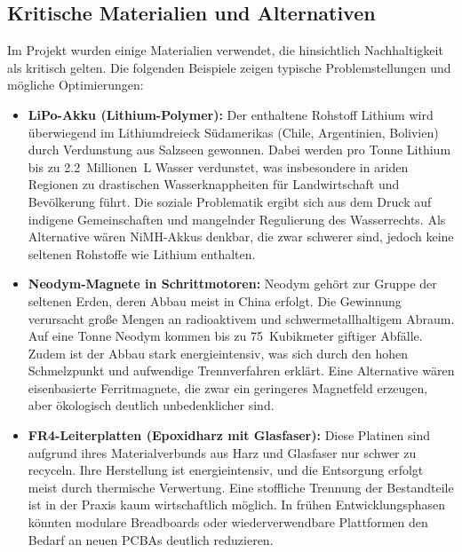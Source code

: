 \documentclass[main.tex]{subfiles} %
\begin{document}

\subsection{Kritische Materialien und Alternativen}

Im Projekt wurden einige Materialien verwendet, die hinsichtlich Nachhaltigkeit 
als kritisch gelten. Die folgenden Beispiele zeigen typische Problemstellungen 
und mögliche Optimierungen:

\begin{itemize}
    \item \textbf{LiPo-Akku (Lithium-Polymer):} 
    Der enthaltene Rohstoff Lithium wird überwiegend im Lithiumdreieck Südamerikas 
    (Chile, Argentinien, Bolivien) durch Verdunstung aus Salzseen gewonnen. Dabei 
    werden pro Tonne Lithium bis zu \SI{2.2}{Millionen\liter} Wasser verdunstet, 
    was insbesondere in ariden Regionen zu drastischen Wasserknappheiten für 
    Landwirtschaft und Bevölkerung führt. Die soziale Problematik ergibt sich aus 
    dem Druck auf indigene Gemeinschaften und mangelnder Regulierung des Wasserrechts. 
    Als Alternative wären NiMH-Akkus denkbar, die zwar schwerer sind, jedoch keine 
    seltenen Rohstoffe wie Lithium enthalten.
    
    \item \textbf{Neodym-Magnete in Schrittmotoren:} 
    Neodym gehört zur Gruppe der seltenen Erden, deren Abbau meist in China erfolgt. 
    Die Gewinnung verursacht große Mengen an radioaktivem und schwermetallhaltigem Abraum.
    Auf eine Tonne Neodym kommen bis zu \SI{75}{Kubikmeter} giftiger Abfälle. Zudem ist 
    der Abbau stark energieintensiv, was sich durch den hohen Schmelzpunkt und aufwendige 
    Trennverfahren erklärt. Eine Alternative wären eisenbasierte Ferritmagnete, die zwar 
    ein geringeres Magnetfeld erzeugen, aber ökologisch deutlich unbedenklicher sind.
    
    \item \textbf{FR4-Leiterplatten (Epoxidharz mit Glasfaser):} 
    Diese Platinen sind aufgrund ihres Materialverbunds aus Harz und Glasfaser nur 
    schwer zu recyceln. Ihre Herstellung ist energieintensiv, und die Entsorgung erfolgt 
    meist durch thermische Verwertung. Eine stoffliche Trennung der Bestandteile ist in 
    der Praxis kaum wirtschaftlich möglich. In frühen Entwicklungsphasen könnten modulare 
    Breadboards oder wiederverwendbare Plattformen den Bedarf an neuen PCBAs deutlich 
    reduzieren.
\end{itemize}
\end{document}
